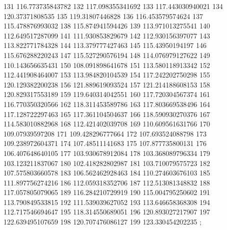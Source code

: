 {131 116.773735843782
132 117.098355341692
133 117.443030940021
134 120.37371808535
135 119.31807446828
136 116.453579574624
137 115.478876993032
138 115.874941594426
139 113.971013275541
140 112.649517287099
141 111.930853829679
142 112.930156397077
143 113.822771784328
144 113.379777427463
145 115.43950194197
146 115.676288220243
147 115.527290576194
148 114.076979127622
149 110.143656635431
150 108.091898641678
151 113.580118913342
152 112.441908464007
153 113.984820104539
154 117.242202750298
155 120.129382200238
156 121.889619093524
157 121.214188608153
158 120.829317553189
159 119.640314042551
160 117.720304567374
161 116.770350320566
162 118.311453589786
163 117.803669538496
164 117.128722297463
165 117.361104504637
166 118.590930270376
167 114.583010882968
168 112.421402039708
169 110.609561631766
170 109.07939597208
171 109.428296777664
172 107.693524088798
173 109.238972604371
174 107.48511141683
175 107.877735800131
176 106.407648640105
177 103.930678912084
178 103.368089796334
179 103.123211837067
180 102.418282802987
181 103.710079575723
182 107.575803660578
183 106.562462928463
184 110.274603676103
185 111.897756274216
186 112.059318352706
187 112.513081348832
188 117.057805079065
189 116.284210729919
190 115.004795250602
191 113.790849533815
192 111.539039627052
193 113.646658368308
194 112.717546694647
195 118.314550689051
196 120.893027217907
197 122.639495107659
198 120.707476086127
199 123.330454202235
};
